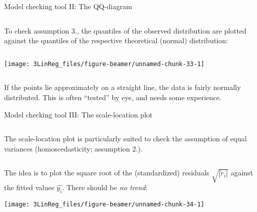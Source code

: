 \documentclass[10pt,ignorenonframetext,]{beamer}
\begin{document}
\begin{frame}

\begin{block}{Model checking tool II: The QQ-diagram}

\(~\)

To check assumption 3., the quantiles of the observed distribution are
plotted against the quantiles of the respective theoretical (normal)
distribution:

\(~\)

\begin{center}\texttt{[image: 3LinReg\_files/figure-beamer/unnamed-chunk-33-1]} \end{center}

\(~\)

If the points lie approximately on a straight line, the data is fairly
normally distributed. This is often ``tested'' by eye, and needs some
experience.

\end{block}

\end{frame}

\begin{frame}

\begin{block}{Model checking tool III: The scale-location plot}

\(~\)

The scale-location plot is particularly suited to check the assumption
of equal variances (homoscedasticity; assumption 2.).

\(~\)

The idea is to plot the square root of the (standardized) residuals
\(\sqrt{|\tilde{r}_i|}\) against the fitted values \(\hat{y_i}\). There
should be \emph{no trend}:

\vspace{2mm}

\begin{center}\texttt{[image: 3LinReg\_files/figure-beamer/unnamed-chunk-34-1]} \end{center}

\end{block}

\end{frame}
\end{document}
